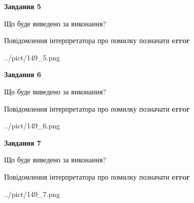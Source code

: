 \documentclass[10pt, ukrainian]{article}
\begin{document}
{\begin {large}
{\begin {center}\textbf{Завдання 5}\end {center}}\par
Що буде виведено за виконання? \par
Повідомлення інтерпретатора про помилку позначати \textbf{error}

\begin{center}
	{../pict/149_5.png}
\end{center}
\newpage

{\begin {center}\textbf{Завдання 6}\end {center}}\par
Що буде виведено за виконання? \par
Повідомлення інтерпретатора про помилку позначати \textbf{error}

\begin{center}
	{../pict/149_6.png}
\end{center}
\newpage

{\begin {center}\textbf{Завдання 7}\end {center}}\par
Що буде виведено за виконання? \par
Повідомлення інтерпретатора про помилку позначати \textbf{error}

\begin{center}
	{../pict/149_7.png}
\end{center}
\newpage

\end {large}}
\end{document}
